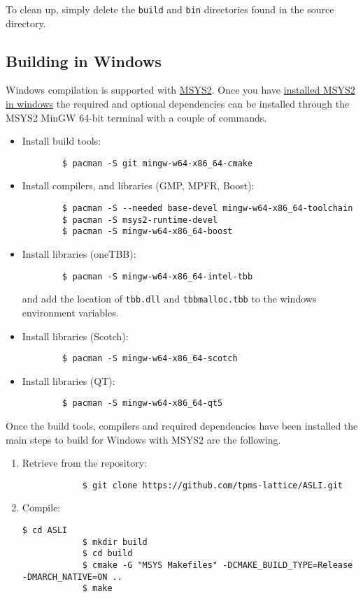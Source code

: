 To clean up, simply delete the \texttt{build} and \texttt{bin} directories found in the source directory.

\subsection{Building \asli{} in Windows}\label{sec:buildWin}
Windows compilation is supported with \href{https://www.msys2.org/}{MSYS2}. Once you have \href{https://www.msys2.org/#installation}{installed MSYS2 in windows} the required and optional dependencies can be installed through the MSYS2 MinGW 64-bit terminal with a couple of commands.

\begin{itemize}
	\item Install build tools:  
	\begin{verbatim}
		$ pacman -S git mingw-w64-x86_64-cmake
	\end{verbatim}

	\item Install compilers, and libraries (GMP, MPFR, Boost):  
	\begin{verbatim}
		$ pacman -S --needed base-devel mingw-w64-x86_64-toolchain
		$ pacman -S msys2-runtime-devel
		$ pacman -S mingw-w64-x86_64-boost
	\end{verbatim}

	\item Install libraries (oneTBB):
	\begin{verbatim}
		$ pacman -S mingw-w64-x86_64-intel-tbb
	\end{verbatim}
	and add the location of \texttt{tbb.dll} and \texttt{tbbmalloc.tbb} to the windows environment variables.

	\item Install libraries (Scotch):
	\begin{verbatim}
		$ pacman -S mingw-w64-x86_64-scotch
	\end{verbatim}

	\item Install libraries (QT):
	\begin{verbatim}
		$ pacman -S mingw-w64-x86_64-qt5
	\end{verbatim}
\end{itemize}

Once the build tools, compilers and required dependencies have been installed the main steps to build \asli{} for Windows with MSYS2 are the following.
\begin{enumerate}
	\item Retrieve \asli{} from the repository:
		\begin{verbatim}
			$ git clone https://github.com/tpms-lattice/ASLI.git
		\end{verbatim}
	\item Compile:
		\begin{Verbatim}[breaklines=true, tabsize=0]
			$ cd ASLI
			$ mkdir build
			$ cd build
			$ cmake -G "MSYS Makefiles" -DCMAKE_BUILD_TYPE=Release -DMARCH_NATIVE=ON ..
			$ make
		\end{Verbatim}
\end{enumerate}

